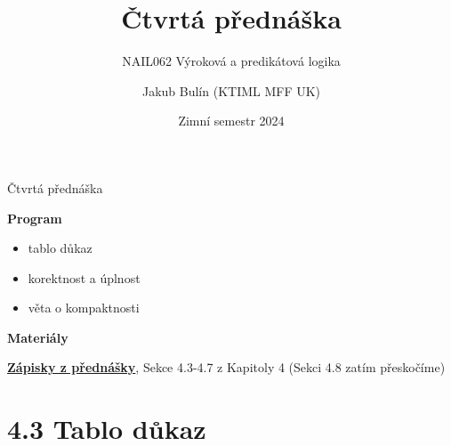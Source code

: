 \documentclass{beamer}
\title{Čtvrtá přednáška}
\subtitle{NAIL062 Výroková a predikátová logika}
\author{Jakub Bulín (KTIML MFF UK)}
\date{Zimní semestr 2024}
\begin{document}
\maketitle


\begin{frame}{Čtvrtá přednáška}

    \textbf{Program}
        \begin{itemize}            
            \item tablo důkaz
            \item korektnost a úplnost
            \item věta o kompaktnosti
        \end{itemize}

    \textbf{Materiály}

        \href{https://github.com/jbulin-mff-uk/nail062/raw/main/lecture/lecture-notes/lecture-notes.pdf}{\alert{\textbf{Zápisky z přednášky}}}, Sekce 4.3-4.7 z Kapitoly 4 (Sekci 4.8 zatím přeskočíme)

\end{frame}


\section{4.3 Tablo důkaz}
\end{document}
